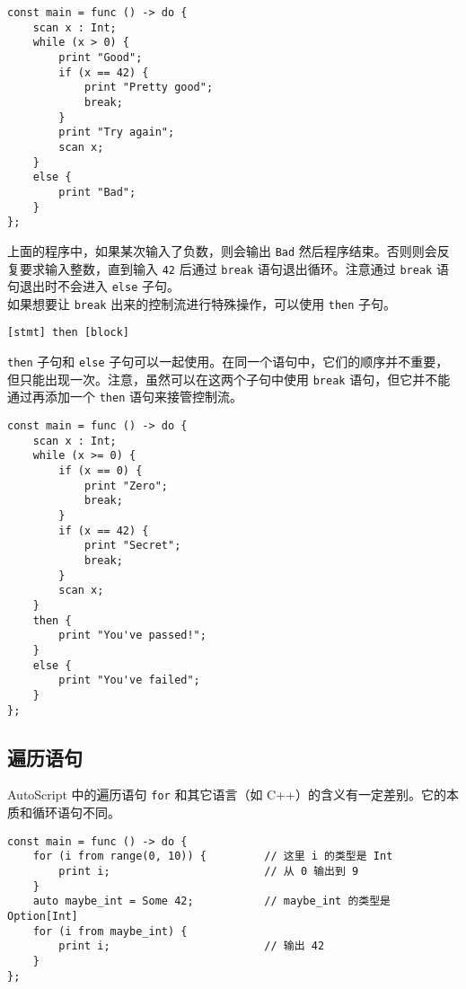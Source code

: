 \begin{lstlisting}
const main = func () -> do {
    scan x : Int;
    while (x > 0) {
        print "Good";
        if (x == 42) {
            print "Pretty good";
            break;
        }
        print "Try again";
        scan x;
    }
    else {
        print "Bad";
    }
};
\end{lstlisting}

上面的程序中，如果某次输入了负数，则会输出 \lstinline!Bad! 然后程序结束。否则则会反复要求输入整数，直到输入 \lstinline!42! 后通过 \lstinline!break! 语句退出循环。注意通过 \lstinline!break! 语句退出时不会进入 \lstinline!else! 子句。 \\

如果想要让 \lstinline!break! 出来的控制流进行特殊操作，可以使用 \lstinline!then! 子句。

\begin{grammar}
    \lstinline![stmt] then [block]!
\end{grammar}

\lstinline!then! 子句和 \lstinline!else! 子句可以一起使用。在同一个语句中，它们的顺序并不重要，但只能出现一次。注意，虽然可以在这两个子句中使用 \lstinline!break! 语句，但它并不能通过再添加一个 \lstinline!then! 语句来接管控制流。

\begin{lstlisting}
const main = func () -> do {
    scan x : Int;
    while (x >= 0) {
        if (x == 0) {
            print "Zero";
            break;
        }
        if (x == 42) {
            print "Secret";
            break;
        }
        scan x;
    }
    then {
        print "You've passed!";
    }
    else {
        print "You've failed";
    }
};
\end{lstlisting}

\subsection{遍历语句}

AutoScript 中的遍历语句 \lstinline!for! 和其它语言（如 C++）的含义有一定差别。它的本质和循环语句不同。

\begin{lstlisting}
const main = func () -> do {
    for (i from range(0, 10)) {			// 这里 i 的类型是 Int
        print i;                        // 从 0 输出到 9
    }
    auto maybe_int = Some 42;			// maybe_int 的类型是 Option[Int]
    for (i from maybe_int) {
        print i;                        // 输出 42
    }
};
\end{lstlisting}

